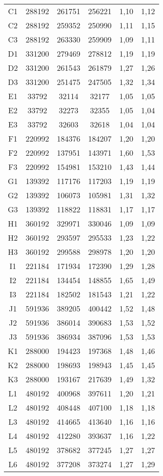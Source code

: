\begin{center}
\begin{longtable}{cccccc}
    C1    & 288192 & 261751 & 256221 & 1,10  & 1,12 \\
    C2    & 288192 & 259352 & 250990 & 1,11  & 1,15 \\
    C3    & 288192 & 263330 & 259909 & 1,09  & 1,11 \\
    D1    & 331200 & 279469 & 278812 & 1,19  & 1,19 \\
    D2    & 331200 & 261543 & 261879 & 1,27  & 1,26 \\
    D3    & 331200 & 251475 & 247505 & 1,32  & 1,34 \\
    E1    & 33792 & 32114 & 32177 & 1,05  & 1,05 \\
    E2    & 33792 & 32273 & 32355 & 1,05  & 1,04 \\
    E3    & 33792 & 32603 & 32618 & 1,04  & 1,04 \\
    F1    & 220992 & 184376 & 184207 & 1,20  & 1,20 \\
    F2    & 220992 & 137951 & 143971 & 1,60  & 1,53 \\
    F3    & 220992 & 154981 & 153210 & 1,43  & 1,44 \\
    G1    & 139392 & 117176 & 117203 & 1,19  & 1,19 \\
    G2    & 139392 & 106073 & 105981 & 1,31  & 1,32 \\
    G3    & 139392 & 118822 & 118831 & 1,17  & 1,17 \\
    H1    & 360192 & 329971 & 330046 & 1,09  & 1,09 \\
    H2    & 360192 & 293597 & 295533 & 1,23  & 1,22 \\
    H3    & 360192 & 299588 & 298978 & 1,20  & 1,20 \\
    I1    & 221184 & 171934 & 172390 & 1,29  & 1,28 \\
    I2    & 221184 & 134454 & 148855 & 1,65  & 1,49 \\
    I3    & 221184 & 182502 & 181543 & 1,21  & 1,22 \\
    J1    & 591936 & 389205 & 400442 & 1,52  & 1,48 \\
    J2    & 591936 & 386014 & 390683 & 1,53  & 1,52 \\
    J3    & 591936 & 386934 & 387096 & 1,53  & 1,53 \\
    K1    & 288000 & 194423 & 197368 & 1,48  & 1,46 \\
    K2    & 288000 & 198693 & 198943 & 1,45  & 1,45 \\
    K3    & 288000 & 193167 & 217639 & 1,49  & 1,32 \\
    L1    & 480192 & 400968 & 397611 & 1,20  & 1,21 \\
    L2    & 480192 & 408448 & 407100 & 1,18  & 1,18 \\
    L3    & 480192 & 414665 & 413640 & 1,16  & 1,16 \\
    L4    & 480192 & 412280 & 393637 & 1,16  & 1,22 \\
    L5    & 480192 & 378682 & 377245 & 1,27  & 1,27 \\
    L6    & 480192 & 377208 & 373274 & 1,27  & 1,29 \\
\end{longtable}
\end{center}


